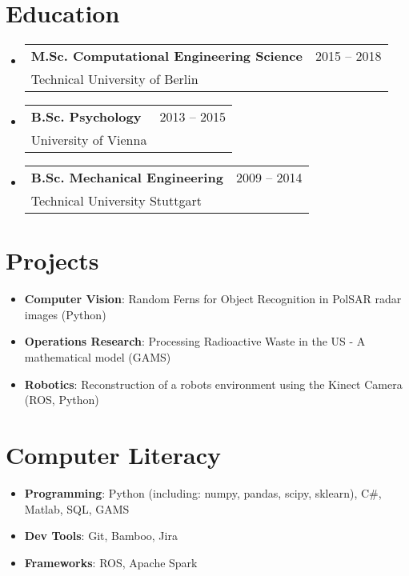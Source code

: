 \documentclass[letterpaper,11pt]{article}
\makeatletter
\newcommand{\resumeItem}[3]{
	\item
	\begin{tabular*}{0.97\textwidth}{l@{\extracolsep{\fill}}r}
		\textbf{#1} & #2 \\ 
		#3& \vspace{-5pt}
	\end{tabular*}}
\newcommand{\resumeSubHeadingListStart}{\begin{itemize}[leftmargin=*]}
\newcommand{\resumeSubHeadingListEnd}{\end{itemize}}
\makeatother
\begin{document}
 \section{Education}
 \resumeSubHeadingListStart
 \resumeItem
 {M.Sc. Computational Engineering Science}{2015 -- 2018}{Technical University of Berlin}
 \resumeItem
 {B.Sc. Psychology}{2013 -- 2015} {University of Vienna}
 \resumeItem
 {B.Sc. Mechanical Engineering}{2009 -- 2014}{Technical University Stuttgart}
 \resumeSubHeadingListEnd
\section{Projects}
  \resumeSubHeadingListStart
  	\item{\textbf{Computer Vision}: Random Ferns for Object Recognition in PolSAR radar images (Python)}
  	\vspace{-0.1in}
    \item{\textbf{Operations Research}: Processing Radioactive Waste in the US - A mathematical model (GAMS)}   
    \vspace{-0.1in} 	
	\item{\textbf{Robotics}: Reconstruction of a robots environment using the Kinect Camera (ROS, Python)}
	\vspace{-0.1in}
\resumeSubHeadingListEnd
\section{Computer Literacy}
\resumeSubHeadingListStart
\item{\textbf{Programming}: Python (including: numpy, pandas, scipy, sklearn), C\#, Matlab, SQL, GAMS}
\vspace{-0.1in}
\item{\textbf{Dev Tools}: Git, Bamboo, Jira}   
\vspace{-0.1in}
\item{\textbf{Frameworks}: ROS, Apache Spark}   
\vspace{-0.1in}
\resumeSubHeadingListEnd
\end{document}
